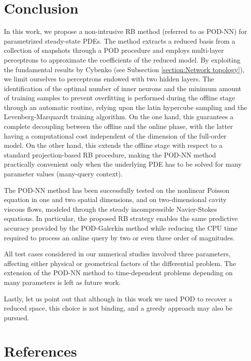 \documentclass[longtitle]{elsarticle}
\numberwithin{equation}{section}
\theoremstyle{theorem}
\theoremstyle{definition}
\theoremstyle{remark}
\theoremstyle{proposition}
\numberwithin{figure}{section}
\begin{document}
	\section{Conclusion}
	\label{section:Conclusion}	
	
		In this work, we propose a non-intrusive RB method (referred to as POD-NN) for parametrized steady-state PDEs. The method extracts a reduced basis from a collection of snapshots through a POD procedure and employs multi-layer perceptrons to approximate the coefficients of the reduced model. By exploiting the fundamental results by Cybenko (see Subsection \ref{section:Network topology}), we limit ourselves to perceptrons endowed with two hidden layers. The identification of the optimal number of inner neurons and the minimum amount of training samples to prevent overfitting is performed during the offline stage through an automatic routine, relying upon the latin hypercube sampling and the Levenberg-Marquardt training algorithm. On the one hand, this guarantees a complete decoupling between the offline and the online phase, with the latter having a computational cost independent of the dimension of the full-order model. On the other hand, this extends the offline stage with respect to a standard projection-based RB procedure, making the POD-NN method practically convenient only when the underlying PDE has to be solved for many parameter values (many-query context). 		

		The POD-NN method has been successfully tested on the nonlinear Poisson equation in one and two spatial dimensions, and on two-dimensional cavity viscous flows, modeled through the steady incompressible Navier-Stokes equations. In particular, the proposed RB strategy enables the same predictive accuracy provided by the POD-Galerkin method while reducing the CPU time required to process an online query by two or even three order of magnitudes.		

		All test cases considered in our numerical studies involved three parameters, affecting either physical or geometrical factors of the differential problem. The extension of the POD-NN method to time-dependent problems depending on many parameters is left as future work. 		

		Lastly, let us point out that although in this work we used POD to recover a reduced space, this choice is not binding, and a greedy approach may also be pursued. 
		
	
		
	\section*{References}
		
\end{document}
